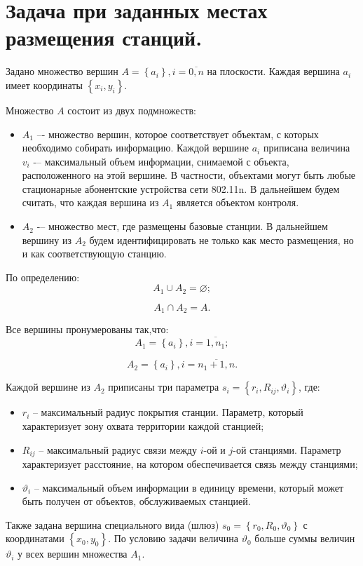 \section{Задача при заданных местах размещения станций.}

Задано множество вершин $A= \left\{ a_i \right\}, i=\overline{0,n}$ на плоскости. Каждая вершина $a_i$ имеет координаты $\left\{ x_i, y_i \right\}$.

Множество $A$ состоит из двух подмножеств:
\begin{itemize}
    \item $A_1$ –- множество вершин, которое соответствует объектам, с которых необходимо собирать информацию. Каждой вершине $a_i$ приписана величина $v_i$ -– максимальный объем информации, снимаемой с объекта, расположенного на этой вершине. В частности, объектами могут быть любые стационарные абонентские устройства сети 802.11n. В дальнейшем будем считать, что каждая вершина из $A_1$ является объектом контроля.
    \item $A_2$ -– множество мест, где размещены базовые станции. В дальнейшем вершину из $A_2$ будем идентифицировать  не только как место размещения, но и как соответствующую станцию.
\end{itemize}

По определению:
$$
A_1 \cup A_2 = \varnothing;
$$

$$
A_1 \cap A_2 = A.
$$

Все вершины пронумерованы так,что:
$$
A_1 = \left\{a_i \right\}, i= \overline{1,n_1};
$$

$$
A_2 = \left\{ a_i  \right\}, i= \overline{n_1+1,n}.
$$

Каждой вершине из $A_2$ приписаны три параметра $s_i = \left\{ r_i, R_{ij},\vartheta_i \right\} $, где:

\begin{itemize}
    \item $r_i$ -- максимальный радиус покрытия станции. Параметр, который характеризует зону охвата территории каждой станцией;
    \item $R_{ij}$ -- максимальный радиус связи между $i$-ой и $j$-ой станциями. Параметр характеризует расстояние, на котором обеспечивается связь между станциями;
    \item $\vartheta_i$ -- максимальный объем информации в единицу времени, который может быть получен от объектов, обслуживаемых станцией.
\end{itemize}

Также задана вершина специального вида (шлюз) $s_0 = \left\{ r_0, R_0, \vartheta_0 \right\} $ с координатами $\left\{x_0, y_0 \right\}$. По условию задачи величина $\vartheta_0$ больше суммы величин $\vartheta_i$ у всех вершин множества $A_1$.

